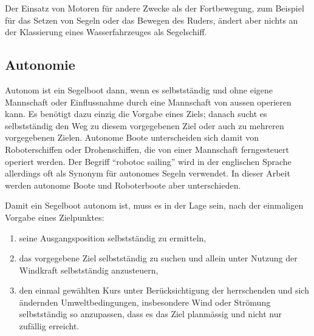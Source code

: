 Der Einsatz von Motoren für andere Zwecke als der Fortbewegung, zum Beispiel für das Setzen von Segeln oder das Bewegen des Ruders, ändert aber nichts an der Klassierung eines Wasserfahrzeuges als Segelschiff. 

\subsection{Autonomie}
Autonom ist ein Segelboot dann, wenn es selbstständig und ohne eigene Mannschaft oder Einflussnahme durch eine Mannschaft von aussen operieren kann. Es benötigt dazu einzig die Vorgabe eines Ziels; danach sucht es selbstständig den Weg zu diesem vorgegebenen Ziel oder auch zu mehreren vorgegebenen Zielen. Autonome Boote unterscheiden sich damit von Roboterschiffen oder Drohenschiffen, die von einer Mannschaft ferngesteuert operiert werden. Der Begriff \enquote{robotoc sailing} wird in der englischen Sprache allerdings oft als Synonym für autonomes Segeln verwendet. In dieser Arbeit werden autonome Boote und Roboterboote aber unterschieden.

Damit ein Segelboot autonom ist, muss es in der Lage sein, nach der einmaligen Vorgabe eines Zielpunktes: 
\begin{enumerate}
    \item seine Ausgangsposition selbstständig zu ermitteln,
    \item das vorgegebene Ziel selbstständig zu suchen und allein unter Nutzung der Windkraft selbstständig anzusteuern,
    \item den einmal gewählten Kurs unter Berücksichtigung der herrschenden und sich ändernden Umweltbedingungen, insbesondere Wind oder Strömung selbstständig so anzupassen, dass es das Ziel planmässig und nicht nur zufällig erreicht.
\end{enumerate}